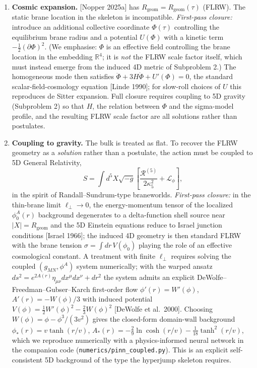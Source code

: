 \documentclass[11pt,a4paper]{article}
\newcommand{\Rgeom}{R_{\mathrm{geom}}}
\begin{document}
\begin{enumerate}[leftmargin=*]
\item \textbf{Cosmic expansion.} [Nopper 2025a] has $\Rgeom=\Rgeom(\tau)$ (FLRW). The static brane location in the skeleton is incompatible. \emph{First-pass closure:} introduce an additional collective coordinate $\Phi(\tau)$ controlling the equilibrium brane radius and a potential $U(\Phi)$ with a kinetic term $-\tfrac{1}{2}(\partial\Phi)^2$. (We emphasise: $\Phi$ is an effective field controlling the brane location in the embedding $\mathbb{R}^4$; it is \emph{not} the FLRW scale factor itself, which must instead emerge from the induced 4D metric of Subproblem 2.) The homogeneous mode then satisfies $\ddot\Phi+3H\dot\Phi+U'(\Phi)=0$, the standard scalar-field-cosmology equation [Linde 1990]; for slow-roll choices of $U$ this reproduces de Sitter expansion. Full closure requires coupling to 5D gravity (Subproblem 2) so that $H$, the relation between $\Phi$ and the sigma-model profile, and the resulting FLRW scale factor are all solutions rather than postulates.

\item \textbf{Coupling to gravity.} The bulk is treated as flat. To recover the FLRW geometry as a \emph{solution} rather than a postulate, the action must be coupled to 5D General Relativity,
\begin{equation}
S = \int d^5 X \sqrt{-g} \left[ \frac{\mathcal{R}^{(5)}}{2 \kappa_5^2} + \mathcal{L}_\phi \right],
\end{equation}
in the spirit of Randall--Sundrum-type braneworlds. \emph{First-pass closure:} in the thin-brane limit $\ell_\perp \to 0$, the energy-momentum tensor of the localized $\phi_0^A(r)$ background degenerates to a delta-function shell source near $\lvert X\rvert = \Rgeom$ and the 5D Einstein equations reduce to Israel junction conditions [Israel 1966]; the induced 4D geometry is then standard FLRW with the brane tension $\sigma = \int dr\, V(\phi_0)$ playing the role of an effective cosmological constant. A treatment with finite $\ell_\perp$ requires solving the coupled $(g_{MN}, \phi^A)$ system numerically; with the warped ansatz $ds^2=e^{2A(r)}\eta_{\mu\nu}dx^\mu dx^\nu+dr^2$ the system admits an explicit DeWolfe--Freedman--Gubser--Karch first-order flow $\phi'(r)=W'(\phi)$, $A'(r)=-W(\phi)/3$ with induced potential $V(\phi)=\tfrac12 W'(\phi)^2-\tfrac23 W(\phi)^2$ [DeWolfe et al.\ 2000]. Choosing $W(\phi)=\phi-\phi^3/(3v^2)$ gives the closed-form domain-wall background $\phi_*(r)=v\tanh(r/v)$, $A_*(r)=-\tfrac{2}{9}\ln\cosh(r/v)-\tfrac{1}{18}\tanh^2(r/v)$, which we reproduce numerically with a physics-informed neural network in the companion code (\texttt{numerics/pinn\_coupled.py}). This is an explicit self-consistent 5D background of the type the hyperjump skeleton requires.


\end{enumerate}
\end{document}

